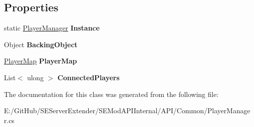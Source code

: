 \subsection*{Properties}
\begin{DoxyCompactItemize}
\item 
\hypertarget{class_s_e_mod_a_p_i_internal_1_1_a_p_i_1_1_common_1_1_player_manager_a18c4b8df82f00142c563789cbeae7f0a}{}static \hyperlink{class_s_e_mod_a_p_i_internal_1_1_a_p_i_1_1_common_1_1_player_manager}{Player\+Manager} {\bfseries Instance}\label{class_s_e_mod_a_p_i_internal_1_1_a_p_i_1_1_common_1_1_player_manager_a18c4b8df82f00142c563789cbeae7f0a}

\item 
\hypertarget{class_s_e_mod_a_p_i_internal_1_1_a_p_i_1_1_common_1_1_player_manager_a7de15dcd0b0517aee4b33cc129486046}{}Object {\bfseries Backing\+Object}\label{class_s_e_mod_a_p_i_internal_1_1_a_p_i_1_1_common_1_1_player_manager_a7de15dcd0b0517aee4b33cc129486046}

\item 
\hypertarget{class_s_e_mod_a_p_i_internal_1_1_a_p_i_1_1_common_1_1_player_manager_a49be5caf85f16bbd66488024259106c1}{}\hyperlink{class_s_e_mod_a_p_i_internal_1_1_a_p_i_1_1_common_1_1_player_map}{Player\+Map} {\bfseries Player\+Map}\label{class_s_e_mod_a_p_i_internal_1_1_a_p_i_1_1_common_1_1_player_manager_a49be5caf85f16bbd66488024259106c1}

\item 
\hypertarget{class_s_e_mod_a_p_i_internal_1_1_a_p_i_1_1_common_1_1_player_manager_a5a3e0c818103f4228720bfaf15fe5108}{}List$<$ ulong $>$ {\bfseries Connected\+Players}\label{class_s_e_mod_a_p_i_internal_1_1_a_p_i_1_1_common_1_1_player_manager_a5a3e0c818103f4228720bfaf15fe5108}

\end{DoxyCompactItemize}


The documentation for this class was generated from the following file\+:\begin{DoxyCompactItemize}
\item 
E\+:/\+Git\+Hub/\+S\+E\+Server\+Extender/\+S\+E\+Mod\+A\+P\+I\+Internal/\+A\+P\+I/\+Common/Player\+Manager.\+cs\end{DoxyCompactItemize}
